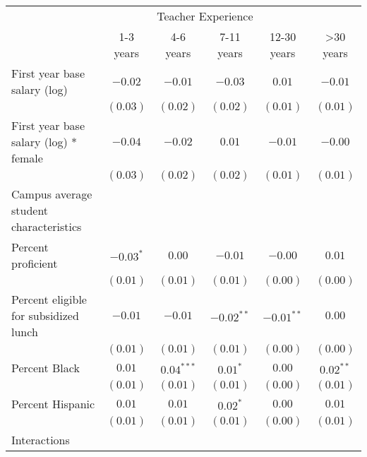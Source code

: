 \documentclass[]{article}
\begin{document}
\begin{table}
\begin{center}
\begin{tabular}{l c c c c c }
\hline
 & \multicolumn{4}{c}{Teacher Experience} \\ \cline{2-5}
 & 1-3 years & 4-6 years & 7-11 years & 12-30 years & >30 years \\
\hline
First year base salary (log)                & $-0.02$     & $-0.01$      & $-0.03$      & $0.01$       & $-0.01$     \\
                                            & $(0.03)$    & $(0.02)$     & $(0.02)$     & $(0.01)$     & $(0.01)$    \\
First year base salary (log) * female       & $-0.04$     & $-0.02$      & $0.01$       & $-0.01$      & $-0.00$     \\
                                            & $(0.03)$    & $(0.02)$     & $(0.02)$     & $(0.01)$     & $(0.01)$    \\
Campus average student characteristics      &             &              &              &              &             \\
\quad Percent proficient                    & $-0.03^{*}$ & $0.00$       & $-0.01$      & $-0.00$      & $0.01$      \\
                                            & $(0.01)$    & $(0.01)$     & $(0.01)$     & $(0.00)$     & $(0.00)$    \\
\quad Percent eligible for subsidized lunch & $-0.01$     & $-0.01$      & $-0.02^{**}$ & $-0.01^{**}$ & $0.00$      \\
                                            & $(0.01)$    & $(0.01)$     & $(0.01)$     & $(0.00)$     & $(0.00)$    \\
\quad Percent Black                         & $0.01$      & $0.04^{***}$ & $0.01^{*}$   & $0.00$       & $0.02^{**}$ \\
                                            & $(0.01)$    & $(0.01)$     & $(0.01)$     & $(0.00)$     & $(0.01)$    \\
\quad Percent Hispanic                      & $0.01$      & $0.01$       & $0.02^{*}$   & $0.00$       & $0.01$      \\
                                            & $(0.01)$    & $(0.01)$     & $(0.01)$     & $(0.00)$     & $(0.01)$    \\
Interactions                                &             &              &              &              &             \\

\end{tabular}
\end{center}
\end{table}
\end{document}
